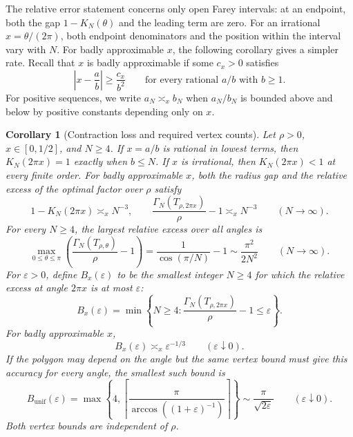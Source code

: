 \documentclass[11pt,a4paper]{article}
\newtheorem{corollary}[theorem]{Corollary}
\theoremstyle{definition}
\theoremstyle{remark}
\numberwithin{equation}{section}
\begin{document}
The relative error statement concerns only open Farey intervals: at an endpoint, both the gap $1-K_N(\theta)$ and the leading term are zero. For an irrational $x=\theta/(2\pi)$, both endpoint denominators and the position within the interval vary with $N$. For badly approximable $x$, the following corollary gives a simpler rate. Recall that $x$ is badly approximable if some $c_x>0$ satisfies
\[
 \left|x-\frac ab\right|\ge\frac{c_x}{b^2}
 \qquad\text{for every rational }a/b\text{ with }b\ge1.
\]
For positive sequences, we write $a_N\asymp_x b_N$ when $a_N/b_N$ is bounded above and below by positive constants depending only on $x$.

\begin{corollary}[Contraction loss and required vertex counts]
\label{cor:complexity-asymptotic}
Let $\rho>0$, $x\in[0,1/2]$, and $N\ge4$. If $x=a/b$ is rational in lowest terms, then $K_N(2\pi x)=1$ exactly when $b\le N$. If $x$ is irrational, then $K_N(2\pi x)<1$ at every finite order.
For badly approximable $x$, both the radius gap and the relative excess of the optimal factor over $\rho$ satisfy
\begin{equation}\label{eq:badly-approximable-loss}
 1-K_N(2\pi x)\asymp_x N^{-3},\qquad
 \frac{\Gamma_N(T_{\rho,2\pi x})}{\rho}-1\asymp_x N^{-3}
 \qquad(N\to\infty).
\end{equation}
For every $N\ge4$, the largest relative excess over all angles is
\begin{equation}\label{eq:uniform-relative-loss}
 \max_{0\le\theta\le\pi}
 \left(\frac{\Gamma_N(T_{\rho,\theta})}{\rho}-1\right)
 =\frac{1}{\cos(\pi/N)}-1\sim\frac{\pi^2}{2N^2}
 \qquad(N\to\infty).
\end{equation}
For $\varepsilon>0$, define $B_x(\varepsilon)$ to be the smallest integer $N\ge4$ for which the relative excess at angle $2\pi x$ is at most $\varepsilon$:
\[
 B_x(\varepsilon)=\min\left\{N\ge4:
   \frac{\Gamma_N(T_{\rho,2\pi x})}{\rho}-1\le\varepsilon\right\}.
\]
For badly approximable $x$,
\[
 B_x(\varepsilon)\asymp_x\varepsilon^{-1/3}
 \qquad(\varepsilon\downarrow0).
\]
If the polygon may depend on the angle but the same vertex bound must give this accuracy for every angle, the smallest such bound is
\begin{equation}\label{eq:uniform-vertex-budget}
 B_{\mathrm{unif}}(\varepsilon)
 =\max\left\{4,
   \left\lceil\frac{\pi}{\arccos((1+\varepsilon)^{-1})}\right\rceil\right\}
 \sim\frac{\pi}{\sqrt{2\varepsilon}}
 \qquad(\varepsilon\downarrow0).
\end{equation}
Both vertex bounds are independent of $\rho$.
\end{corollary}
\end{document}
